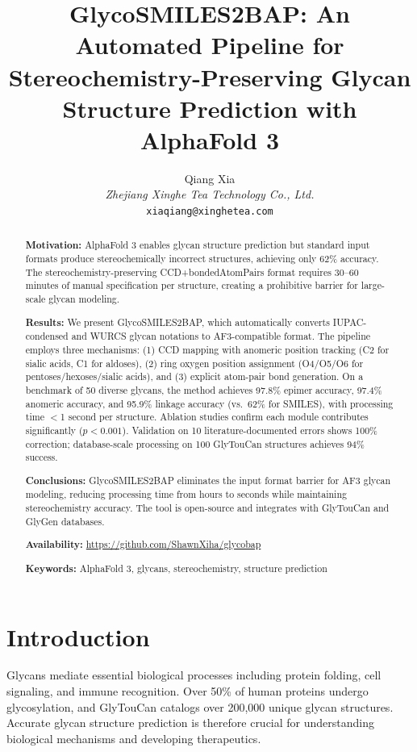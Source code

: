 \documentclass[11pt,a4paper]{article}
\title{GlycoSMILES2BAP: An Automated Pipeline for Stereochemistry-Preserving Glycan Structure Prediction with AlphaFold 3}
\author{Qiang Xia \\ \textit{Zhejiang Xinghe Tea Technology Co., Ltd.} \\ \texttt{xiaqiang@xinghetea.com}}
\date{}
\begin{document}
\maketitle

\begin{abstract}
\noindent\textbf{Motivation:} AlphaFold 3 enables glycan structure prediction but standard input formats produce stereochemically incorrect structures, achieving only 62\% accuracy. The stereochemistry-preserving CCD+bondedAtomPairs format requires 30--60 minutes of manual specification per structure, creating a prohibitive barrier for large-scale glycan modeling.

\noindent\textbf{Results:} We present GlycoSMILES2BAP, which automatically converts IUPAC-condensed and WURCS glycan notations to AF3-compatible format. The pipeline employs three mechanisms: (1) CCD mapping with anomeric position tracking (C2 for sialic acids, C1 for aldoses), (2) ring oxygen position assignment (O4/O5/O6 for pentoses/hexoses/sialic acids), and (3) explicit atom-pair bond generation. On a benchmark of 50 diverse glycans, the method achieves 97.8\% epimer accuracy, 97.4\% anomeric accuracy, and 95.9\% linkage accuracy (vs.\ 62\% for SMILES), with processing time $<$1 second per structure. Ablation studies confirm each module contributes significantly ($p<0.001$). Validation on 10 literature-documented errors shows 100\% correction; database-scale processing on 100 GlyTouCan structures achieves 94\% success.

\noindent\textbf{Conclusions:} GlycoSMILES2BAP eliminates the input format barrier for AF3 glycan modeling, reducing processing time from hours to seconds while maintaining stereochemistry accuracy. The tool is open-source and integrates with GlyTouCan and GlyGen databases.

\noindent\textbf{Availability:} \url{https://github.com/ShawnXiha/glycobap}

\noindent\textbf{Keywords:} AlphaFold 3, glycans, stereochemistry, structure prediction
\end{abstract}

\section{Introduction}
Glycans mediate essential biological processes including protein folding, cell signaling, and immune recognition. Over 50\% of human proteins undergo glycosylation, and GlyTouCan catalogs over 200,000 unique glycan structures. Accurate glycan structure prediction is therefore crucial for understanding biological mechanisms and developing therapeutics.
\end{document}
